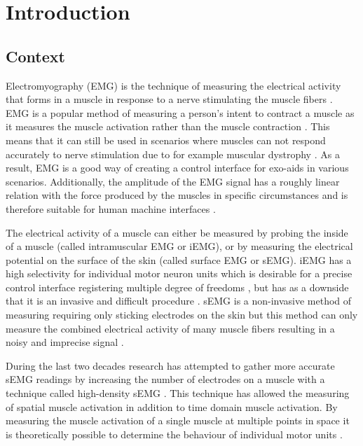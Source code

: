 \chapter{Introduction}
\section{Context}
Electromyography (EMG) is the technique of measuring the electrical activity that forms in a muscle in response to a nerve stimulating the muscle fibers \cite{biomechanics_research_methods} \cite{wikipedia_emg}. EMG is a popular method of measuring a person's intent to contract a muscle as it measures the muscle activation rather than the muscle contraction \cite{control_interfaces_intention_detection}\cite{human_robotics}. This means that it can still be used in scenarios where muscles can not respond accurately to nerve stimulation due to for example muscular dystrophy \cite{emg_arm_function_boys_pilot}. As a result, EMG is a good way of creating a control interface for exo-aids in various scenarios. Additionally, the amplitude of the EMG signal has a roughly linear relation with the force produced by the muscles in specific circumstances \cite{interpreting_muscle_function_from_emg} and is therefore suitable for human machine interfaces \cite{adaptive_filter_dry_electrode}.

The electrical activity of a muscle can either be measured by probing the inside of a muscle (called intramuscular EMG or iEMG), or by measuring the electrical potential on the surface of the skin (called surface EMG or sEMG). iEMG has a high selectivity for individual motor neuron units which is desirable for a precise control interface registering multiple degree of freedoms \cite{semg_vs_iemg}, but has as a downside that it is an invasive and difficult procedure \cite{intramuscular_emg_signals}. sEMG is a non-invasive method of measuring requiring only sticking electrodes on the skin but this method can only measure the combined electrical activity of many muscle fibers resulting in a noisy and imprecise signal \cite{wiki:Electromyography}. 

During the last two decades research has attempted to gather more accurate sEMG readings by increasing the number of electrodes on a muscle with a technique called high-density sEMG \cite{high_density_semg}. 
This technique has allowed the measuring of spatial muscle activation in addition to time domain muscle activation. By measuring the muscle activation of a single muscle at multiple points in space it is theoretically possible to determine the behaviour of individual motor units \cite{high_density_semg_clinical_applications}.

